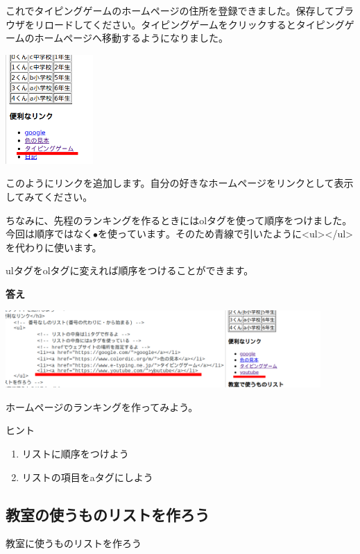\documentclass[a4paper,12pt]{jarticle}
\begin{document}
\bigskip
\flushleft

これでタイピングゲームのホームページの住所を登録できました。保存してブラウザをリロードしてください。タイピングゲームをクリックするとタイピングゲームのホームページへ移動するようになりました。


\bigskip
\centering
\includegraphics[width=0.25\textwidth]{textbook-img201.png}


\flushleft
このようにリンクを追加します。自分の好きなホームページをリンクとして表示してみてください。

ちなみに、先程のランキングを作るときにはolタグを使って順序をつけました。今回は順序ではなく${\bullet}を使っています。そのため青線で引いたように${\textless}ul{\textgreater}{\textless}/ul{\textgreater}を代わりに使います。

ulタグをolタグに変えれば順序をつけることができます。


\bigskip

\textbf{答え}

\centering
\includegraphics[width=0.9\textwidth]{textbook-img202.png}

\flushleft
{}\theQuestion\label{Q:hasAnswer04-10}


ホームページのランキングを作ってみよう。

ヒント

\begin{enumerate}
  \item リストに順序をつけよう
  \item リストの項目をaタグにしよう
\end{enumerate}

\clearpage
{}
\subsection{\theExercise 教室の使うものリストを作ろう}
教室に使うものリストを作ろう
\end{document}
